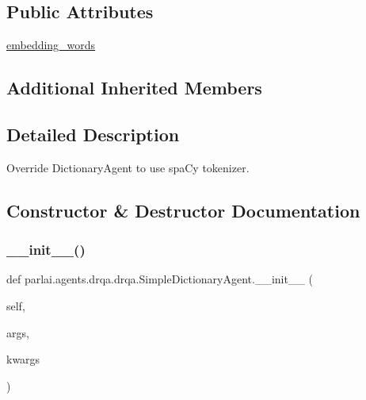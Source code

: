 \subsection*{Public Attributes}
\begin{DoxyCompactItemize}
\item 
\hyperlink{classparlai_1_1agents_1_1drqa_1_1drqa_1_1SimpleDictionaryAgent_a26ce0c0cc3362b43219d488826c3550a}{embedding\+\_\+words}
\end{DoxyCompactItemize}
\subsection*{Additional Inherited Members}


\subsection{Detailed Description}
\begin{DoxyVerb}Override DictionaryAgent to use spaCy tokenizer.
\end{DoxyVerb}
 

\subsection{Constructor \& Destructor Documentation}
\mbox{\label{classparlai_1_1agents_1_1drqa_1_1drqa_1_1SimpleDictionaryAgent_ae21eeff2d5a918998ca8ea90279c9b07}} 
\subsubsection{\texorpdfstring{\+\_\+\+\_\+init\+\_\+\+\_\+()}{\_\_init\_\_()}}
{\footnotesize\ttfamily def parlai.\+agents.\+drqa.\+drqa.\+Simple\+Dictionary\+Agent.\+\_\+\+\_\+init\+\_\+\+\_\+ (\begin{DoxyParamCaption}\item[{}]{self,  }\item[{}]{args,  }\item[{}]{kwargs }\end{DoxyParamCaption})}




